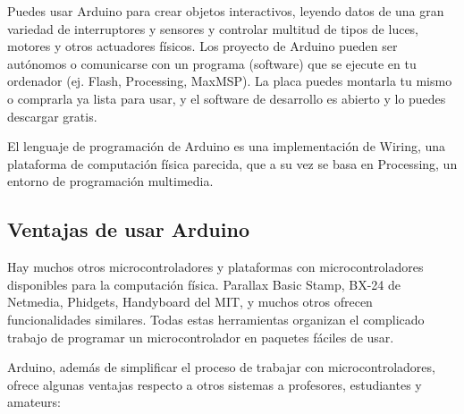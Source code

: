 \documentclass[12pt,a4paper]{report}
\begin{document}
Puedes usar Arduino para crear objetos interactivos, leyendo datos de una gran
variedad de interruptores y sensores y controlar multitud de tipos de luces,
motores y otros actuadores físicos. Los proyecto de Arduino pueden ser autónomos
o comunicarse con un programa (software) que se ejecute en tu ordenador (ej.
Flash, Processing, MaxMSP). La placa puedes montarla tu mismo o comprarla ya
lista para usar, y el software de desarrollo es abierto y lo puedes descargar
gratis.

El lenguaje de programación de Arduino es una implementación de Wiring, una
plataforma de computación física parecida, que a su vez se basa en Processing,
un entorno de programación multimedia.


\subsection{Ventajas de usar Arduino}

Hay muchos otros microcontroladores y plataformas con microcontroladores
disponibles para la computación física. Parallax Basic Stamp, BX-24 de Netmedia,
Phidgets, Handyboard del MIT, y muchos otros ofrecen funcionalidades similares.
Todas estas herramientas organizan el complicado trabajo de programar un
microcontrolador en paquetes fáciles de usar.

Arduino, además de simplificar el proceso de trabajar con microcontroladores,
ofrece algunas ventajas respecto a otros sistemas a profesores, estudiantes y
amateurs:
\end{document}
